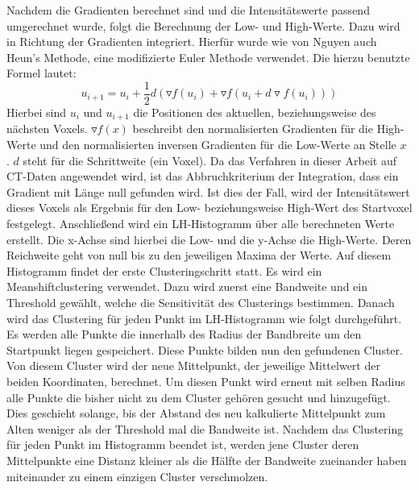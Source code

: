 Nachdem die Gradienten berechnet sind und die Intensitätswerte passend umgerechnet wurde, folgt die Berechnung der Low- und High-Werte. Dazu wird in Richtung der Gradienten integriert. Hierfür wurde wie von Nguyen auch Heun's Methode, eine modifizierte Euler Methode verwendet. Die hierzu benutzte Formel lautet:
\begin{equation}
	u_{i+1} = u_{i} + \frac{1}{2}d(\triangledown f (u_{i}) + \triangledown f(u_{i}+d \triangledown f(u_{i}))) 
\end{equation}
Hierbei sind $u_{i}$ und $u_{i+1}$ die Positionen des aktuellen, beziehungsweise des nächsten Voxels. $\triangledown f(x)$ beschreibt den normalisierten Gradienten für die High-Werte und den normalisierten inversen Gradienten für die Low-Werte an Stelle $x$ . $d$ steht für die Schrittweite (ein Voxel).
Da das Verfahren in dieser Arbeit auf CT-Daten angewendet wird, ist das Abbruchkriterium der Integration, dass ein Gradient mit Länge null gefunden wird. Ist dies der Fall, wird der Intensitätswert dieses Voxels als Ergebnis für den Low- beziehungsweise High-Wert des Startvoxel festgelegt.
\newline
Anschließend wird ein LH-Histogramm über alle berechneten Werte erstellt. Die x-Achse sind hierbei die Low- und die y-Achse die High-Werte. Deren Reichweite geht von null bis zu den jeweiligen Maxima der Werte.
\newline
Auf diesem Histogramm findet der erste Clusteringschritt  statt. Es wird ein Meanshiftclustering verwendet. Dazu wird zuerst eine Bandweite und ein Threshold gewählt, welche die Sensitivität des Clusterings bestimmen. Danach wird das Clustering für jeden Punkt im LH-Histogramm wie folgt durchgeführt.
\newline
Es werden alle Punkte die innerhalb des Radius der Bandbreite um den Startpunkt liegen gespeichert. Diese Punkte bilden nun den gefundenen Cluster. Von diesem Cluster wird der neue Mittelpunkt, der jeweilige Mittelwert der beiden Koordinaten, berechnet. Um diesen Punkt wird erneut mit selben Radius alle Punkte die bisher nicht zu dem Cluster gehören gesucht und hinzugefügt. Dies geschieht solange, bis der Abstand des neu kalkulierte Mittelpunkt zum Alten weniger als der Threshold mal die Bandweite ist. 
Nachdem das Clustering für jeden Punkt im Histogramm beendet ist, werden jene Cluster deren Mittelpunkte eine Distanz kleiner als die Hälfte der Bandweite zueinander haben miteinander zu einem einzigen Cluster verschmolzen.
\newline
{}
